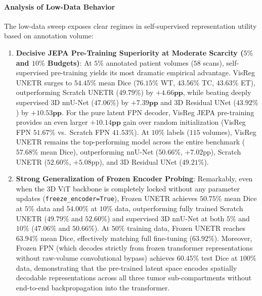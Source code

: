 \documentclass{article}
\begin{document}
\paragraph{Analysis of Low-Data Behavior}
The low-data sweep exposes clear regimes in self-supervised representation utility based on annotation volume:
\begin{enumerate}
    \item \textbf{Decisive JEPA Pre-Training Superiority at Moderate Scarcity ($5\%$ and $10\%$ Budgets)}: At $5\%$ annotated patient volumes ($58$ scans), self-supervised pre-training yields its most dramatic empirical advantage. VisReg UNETR surges to $\mathbf{54.45\%}$ mean Dice ($76.15\%$ WT, $43.56\%$ TC, $43.63\%$ ET), outperforming Scratch UNETR ($49.79\%$) by $\mathbf{+4.66\text{pp}}$, while beating deeply supervised 3D nnU-Net ($47.06\%$) by $\mathbf{+7.39\text{pp}}$ and 3D Residual UNet ($43.92\%$) by $\mathbf{+10.53\text{pp}}$. For the pure latent FPN decoder, VisReg JEPA pre-training provides an even larger $\mathbf{+10.14\text{pp}}$ gain over random initialization (VisReg FPN $51.67\%$ vs.\ Scratch FPN $41.53\%$). At $10\%$ labels ($115$ volumes), VisReg UNETR remains the top-performing model across the entire benchmark ($\mathbf{57.68\%}$ mean Dice), outperforming nnU-Net ($50.66\%$, $+7.02\text{pp}$), Scratch UNETR ($52.60\%$, $+5.08\text{pp}$), and 3D Residual UNet ($49.21\%$).
    \item \textbf{Strong Generalization of Frozen Encoder Probing}: Remarkably, even when the 3D ViT backbone is completely locked without any parameter updates (\texttt{freeze\_encoder=True}), Frozen UNETR achieves $50.75\%$ mean Dice at $5\%$ data and $54.00\%$ at $10\%$ data, outperforming fully trained Scratch UNETR ($49.79\%$ and $52.60\%$) and supervised 3D nnU-Net at both $5\%$ and $10\%$ ($47.06\%$ and $50.66\%$). At $50\%$ training data, Frozen UNETR reaches $63.94\%$ mean Dice, effectively matching full fine-tuning ($63.92\%$). Moreover, Frozen FPN (which decodes strictly from frozen transformer representations without raw-volume convolutional bypass) achieves $60.45\%$ test Dice at $100\%$ data, demonstrating that the pre-trained latent space encodes spatially decodable representations across all three tumor sub-compartments without end-to-end backpropagation into the transformer.

\end{enumerate}
\end{document}
